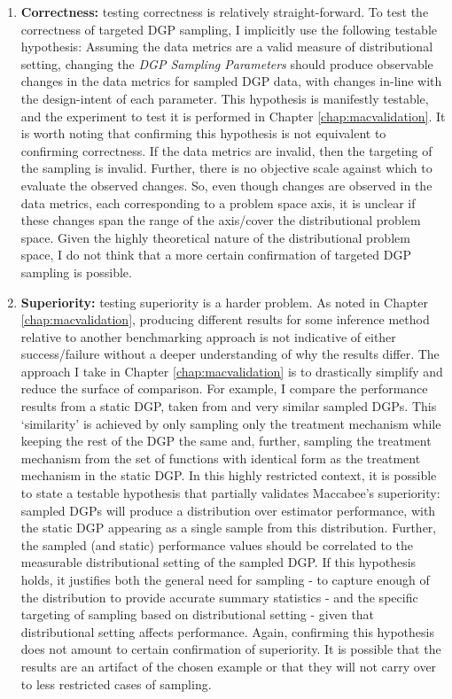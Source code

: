 \documentclass[./main.tex]{subfiles}
\begin{document}
\begin{enumerate}
    \item \textbf{Correctness:} testing correctness is relatively straight-forward. To test the correctness of targeted DGP sampling, I implicitly use the following testable hypothesis: Assuming the data metrics are a valid measure of distributional setting, changing the \textit{DGP Sampling Parameters} should produce observable changes in the data metrics for sampled DGP data, with changes in-line with the design-intent of each parameter. This hypothesis is manifestly testable, and the experiment to test it is performed in Chapter \ref{chap:macvalidation}. It is worth noting that confirming this hypothesis is not equivalent to confirming correctness. If the data metrics are invalid, then the targeting of the sampling is invalid. Further, there is no objective scale against which to evaluate the observed changes. So, even though changes are observed in the data metrics, each corresponding to a problem space axis, it is unclear if these changes span the range of the axis/cover the distributional problem space. Given the highly theoretical nature of the distributional problem space, I do not think that a more certain confirmation of targeted DGP sampling is possible.
    
    \item \textbf{Superiority:} testing superiority is a harder problem. As noted in Chapter \ref{chap:macvalidation}, producing different results for some inference method relative to another benchmarking approach is not indicative of either success/failure without a deeper understanding of why the results differ. The approach I take in Chapter \ref{chap:macvalidation} is to drastically simplify and reduce the surface of comparison. For example, I compare the performance results from a static DGP, taken from \textcite{Diamond2012GeneticStudies} and very similar sampled DGPs. This `similarity' is achieved by only sampling only the treatment mechanism while keeping the rest of the DGP the same and, further, sampling the treatment mechanism from the set of functions with identical form as the treatment mechanism in the static DGP. In this highly restricted context, it is possible to state a testable hypothesis that partially validates Maccabee's superiority: sampled DGPs will produce a distribution over estimator performance, with the static DGP appearing as a single sample from this distribution. Further, the sampled (and static) performance values should be correlated to the measurable distributional setting of the sampled DGP. If this hypothesis holds, it justifies both the general need for sampling - to capture enough of the distribution to provide accurate summary statistics - and the specific targeting of sampling based on distributional setting - given that distributional setting affects performance. Again, confirming this hypothesis does not amount to certain confirmation of superiority. It is possible that the results are an artifact of the chosen example or that they will not carry over to less restricted cases of sampling.
\end{enumerate}
\end{document}
